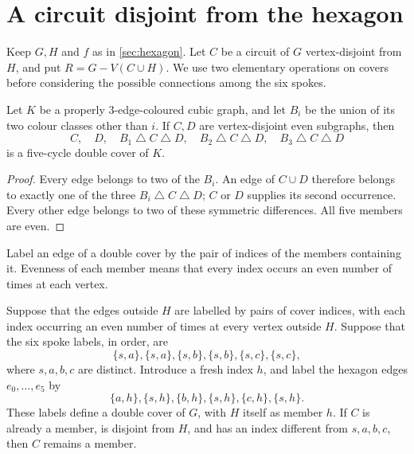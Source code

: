 \documentclass[justified,notoc,twoside,nobib,nofonts]{tufte-handout}
\newcommand{\sd}{\mathbin{\triangle}}
\begin{document}
\section{A circuit disjoint from the hexagon}\label{sec:disjoint}

Keep $G,H$ and $f$ as in \cref{sec:hexagon}. Let $C$ be a circuit of
$G$ vertex-disjoint from $H$, and put $R=G-V(C\cup H)$. We use two
elementary operations on covers before considering the possible
connections among the six spokes.

\begin{lemma}\label{lem:toggle}
Let $K$ be a properly 3-edge-coloured cubic graph, and let $B_i$ be
the union of its two colour classes other than $i$. If $C,D$ are
vertex-disjoint even subgraphs, then
\begin{equation}\label{eq:toggle}
 C,\quad D,\quad B_1\sd C\sd D,\quad
 B_2\sd C\sd D,\quad B_3\sd C\sd D
\end{equation}
is a five-cycle double cover of $K$.
\end{lemma}

\begin{proof}
Every edge belongs to two of the $B_i$. An edge of $C\cup D$
therefore belongs to exactly one of the three $B_i\sd C\sd D$;
$C$ or $D$ supplies its second occurrence. Every other edge belongs
to two of these symmetric differences. All five members are even.
\end{proof}

Label an edge of a double cover by the pair of indices of the members
containing it. Evenness of each member means that every index occurs
an even number of times at each vertex.

\begin{lemma}\label{lem:restore}
Suppose that the edges outside $H$ are labelled by pairs of cover
indices, with each index occurring an even number of times at every
vertex outside $H$. Suppose that the six spoke labels, in order, are
\[
 \{s,a\},\{s,a\},\{s,b\},\{s,b\},\{s,c\},\{s,c\},
\]
where $s,a,b,c$ are distinct. Introduce a fresh index $h$, and label
the hexagon edges $e_0,\dots,e_5$ by
\begin{equation}\label{eq:restore}
 \{a,h\},\{s,h\},\{b,h\},\{s,h\},\{c,h\},\{s,h\}.
\end{equation}
These labels define a double cover of $G$, with $H$ itself as member $h$.
If $C$ is already a member, is disjoint from $H$, and has an index
different from $s,a,b,c$, then $C$ remains a member.
\end{lemma}
\end{document}
